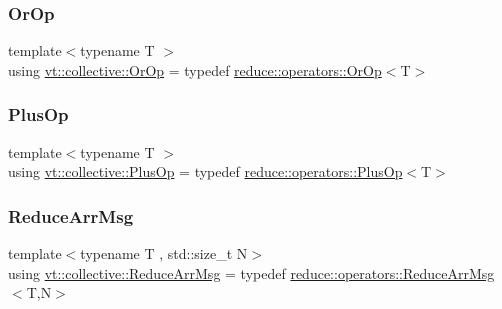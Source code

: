 \subsubsection{\texorpdfstring{Or\+Op}{OrOp}}
{\footnotesize\ttfamily template$<$typename T $>$ \\
using \hyperlink{namespacevt_1_1collective_a47e3b11aa019f643f23effceb60ee94a}{vt\+::collective\+::\+Or\+Op} = typedef \hyperlink{structvt_1_1collective_1_1reduce_1_1operators_1_1_or_op}{reduce\+::operators\+::\+Or\+Op}$<$T$>$}

\mbox{\label{namespacevt_1_1collective_a7a695a8e6ed8247f643918113b7bf881}} 
\subsubsection{\texorpdfstring{Plus\+Op}{PlusOp}}
{\footnotesize\ttfamily template$<$typename T $>$ \\
using \hyperlink{namespacevt_1_1collective_a7a695a8e6ed8247f643918113b7bf881}{vt\+::collective\+::\+Plus\+Op} = typedef \hyperlink{structvt_1_1collective_1_1reduce_1_1operators_1_1_plus_op}{reduce\+::operators\+::\+Plus\+Op}$<$T$>$}

\mbox{\label{namespacevt_1_1collective_a12eddadcf360fcb9d05149e2d8aa327a}} 
\subsubsection{\texorpdfstring{Reduce\+Arr\+Msg}{ReduceArrMsg}}
{\footnotesize\ttfamily template$<$typename T , std\+::size\+\_\+t N$>$ \\
using \hyperlink{namespacevt_1_1collective_a12eddadcf360fcb9d05149e2d8aa327a}{vt\+::collective\+::\+Reduce\+Arr\+Msg} = typedef \hyperlink{structvt_1_1collective_1_1reduce_1_1operators_1_1_reduce_arr_msg}{reduce\+::operators\+::\+Reduce\+Arr\+Msg}$<$T,N$>$}

\mbox{\label{namespacevt_1_1collective_a4c5bf7769ad4396573d6bcc85ec430a4}} 
